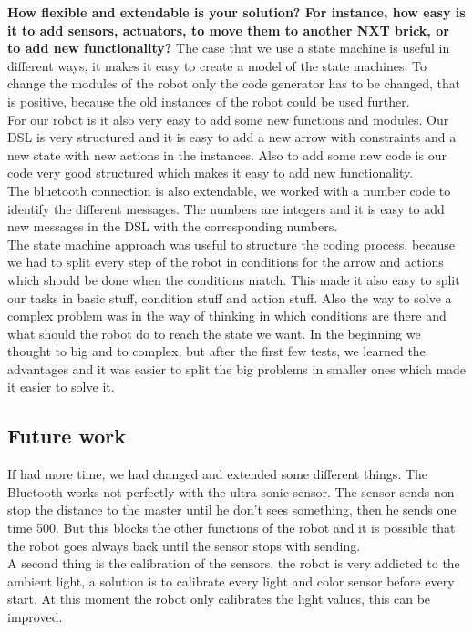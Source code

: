 \documentclass[11pt,a4paper]{article}
\begin{document}
\textbf{How flexible and extendable is your solution? For instance, how easy is it to add sensors, actuators, to move them to another NXT brick, or to add new functionality?}
The case that we use a state machine is useful in different ways, it makes it easy to create a model of the state machines. To change the modules of the robot only the code generator has to be changed, that is positive, because the old instances of the robot could be used further. \\
For our robot is it also very easy to add some new functions and modules. Our DSL is very structured and it is easy to add a new arrow with constraints and a new state with new actions in the instances. Also to add some new code is our code very good structured which makes it easy to add new functionality. \\
The bluetooth connection is also extendable, we worked with a number code to identify the different messages. The numbers are integers and it is easy to add new messages in the DSL with the corresponding numbers. \\
The state machine approach was useful to structure the coding process, because we had to split every step of the robot in conditions for the arrow and actions which should be done when the conditions match. This made it also easy to split our tasks in basic stuff, condition stuff and action stuff. Also the way to solve a complex problem was in the way of thinking in which conditions are there and what should the robot do to reach the state we want. In the beginning we thought to big and to complex, but after the first few tests, we learned the advantages and it was easier to split the big problems in smaller ones which made it easier to solve it. \\

\subsection{Future work}
If had more time, we had changed  and extended some different things. The Bluetooth works not perfectly with the ultra sonic sensor. The sensor sends non stop the distance to the master until he don't sees something, then he sends one time 500. But this blocks the other functions of the robot and it is possible that the robot goes always back until the sensor stops with sending. \\
A second thing is the calibration of the sensors, the robot is very addicted to the ambient light, a solution is to calibrate every light and color sensor before every start. At this moment the robot only calibrates the light values, this can be improved. 
\end{document}
